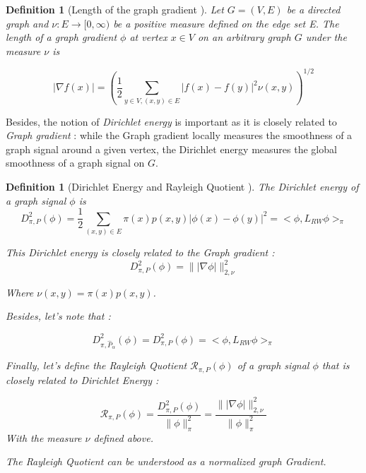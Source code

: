 \documentclass[sn-mathphys]{sn-jnl}%
\theoremstyle{thmstyleone}%
\theoremstyle{thmstyletwo}%
\theoremstyle{thmstylethree}%
\newtheorem{definition}[theo]{Definition}
\begin{document}
\begin{definition}[Length of the graph gradient \cite{sevi2019, coulhon_grigoryan_1998}]
  Let $G=(V,E)$ be a directed graph and
  $\nu : E \rightarrow [0, \infty)$ be a positive measure defined on
  the edge set E. The length of a graph gradient $\phi$ at vertex
  $x \in V$ on an arbitrary graph $G$ under the measure $\nu$ is

\begin{equation}
    | \nabla f(x) | = (\frac{1}{2} \underset{y \in V, (x,y) \in E}{\sum} |f(x)-f(y)|^2 \nu(x,y))^{1/2}
\end{equation}

\end{definition}

Besides, the notion of \textit{Dirichlet energy} is important as it is
closely related to \textit{Graph gradient} : while the Graph gradient
locally measures the smoothness of a graph signal around a given
vertex, the Dirichlet energy measures the global smoothness of a graph
signal on $G$.

\begin{definition}[Dirichlet Energy and Rayleigh Quotient
  \cite{sevi2019, montenegro_tetali_2005}]

  The Dirichlet energy of a graph signal $\phi$ is
\begin{equation}
    D^2_{\pi, P} (\phi) = \frac{1}{2} \underset{(x,y)\in E}{\sum} \pi(x) p(x,y) |\phi(x)-\phi(y)|^2 = <\phi, L_{RW} \phi>_{\pi} 
\end{equation}

This Dirichlet energy is closely related to the \textit{Graph gradient} :
\begin{equation}
    D^2_{\pi, P} (\phi) = \| |\nabla \phi| \|^2_{2, \nu}
\end{equation}

Where $\nu(x,y) = \pi(x) p(x,y)$. 

Besides, let's note that :

\begin{equation}
    D^2_{\pi, \hat{P}_\alpha}(\phi) = D^2_{\pi, P}(\phi) = <\phi, L_{RW} \phi>_{\pi}
\end{equation}

Finally, let's define the Rayleigh Quotient
$\mathcal{R}_{\pi, P}(\phi)$ of a graph signal $\phi$ that is closely
related to \textit{Dirichlet Energy} :

\begin{equation}
    \mathcal{R}_{\pi, P}(\phi) = \frac{D_{\pi, P}^2(\phi)}{\| \phi \|_{\pi}^2} = \frac{\| |\nabla \phi| \|^2_{2, \nu}}{\| \phi \|_{\pi}^2}
\end{equation}
With the measure $\nu$ defined above.

The Rayleigh Quotient can be understood as a normalized graph Gradient.

\end{definition}
\end{document}
